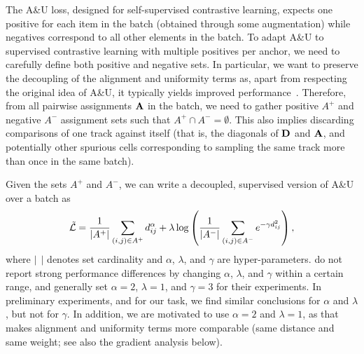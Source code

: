 The A\&U loss, designed for self-supervised contrastive learning, expects one positive for each item in the batch (obtained through some augmentation) while negatives correspond to all other elements in the batch. %
To adapt A\&U to supervised contrastive learning with multiple positives per anchor, we need to carefully define both positive and negative sets. %
In particular, we want to preserve the decoupling of the alignment and uniformity terms as, apart from respecting the original idea of A\&U, it typically yields improved performance~\cite{yeh_decoupled_2022}. Therefore, from all pairwise assignments $\textbf{A}$ in the batch, we need to gather positive $A^+$ and negative $A^-$ assignment sets such that $A^+\cap A^-=\emptyset$. This also implies discarding comparisons of one track against itself (that is, the diagonals of $\textbf{D}$ and $\textbf{A}$, and potentially other spurious cells corresponding to sampling the same track more than once in the same batch).

Given the sets $A^+$ and $A^-$, we can write a decoupled, supervised version of A\&U over a batch as
\begin{equation}
\tilde{\mathcal{L}} = \frac{1}{|A^+|} \sum_{(i,j)\in A^+} d_{ij}^\alpha + \lambda \log\left( \frac{1}{|A^-|} \sum_{(i,j)\in A^-} e^{-\gamma d^2_{ij}} \right) ,
\label{eq:au}
\end{equation}
where $|~~|$ denotes set cardinality and $\alpha$, $\lambda$, and $\gamma$ are hyper-parameters. \citet{wang_understanding_2020} do not report strong performance differences by changing $\alpha$, $\lambda$, and $\gamma$ within a certain range, and generally set $\alpha=2$, $\lambda=1$, and $\gamma=3$ for their experiments. In preliminary experiments, and for our task, we find similar conclusions for $\alpha$ and $\lambda$, but not for $\gamma$. In addition, we are motivated to use $\alpha=2$ and $\lambda=1$, as that makes alignment and uniformity terms more comparable (same distance and same weight; see also the gradient analysis below). %

